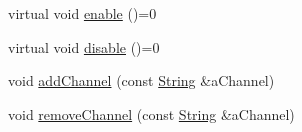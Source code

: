 \begin{DoxyCompactItemize}
\item 
virtual void \hyperlink{classlibrary_1_1core_1_1logger_1_1sinks_1_1Sink_aa41e2b1488d2e761ded1d209eacf02b3}{enable} ()=0
\item 
virtual void \hyperlink{classlibrary_1_1core_1_1logger_1_1sinks_1_1Sink_a3ab28f7a964d138fc9d080f026bb4143}{disable} ()=0
\item 
void \hyperlink{classlibrary_1_1core_1_1logger_1_1sinks_1_1Sink_a7905264ef5dde58d967fd7ebb011bdf9}{add\+Channel} (const \hyperlink{classlibrary_1_1core_1_1types_1_1String}{String} \&a\+Channel)
\item 
void \hyperlink{classlibrary_1_1core_1_1logger_1_1sinks_1_1Sink_a5dd0f0385cd5ba7d281864ba6b8ff7a7}{remove\+Channel} (const \hyperlink{classlibrary_1_1core_1_1types_1_1String}{String} \&a\+Channel)
\end{DoxyCompactItemize}
